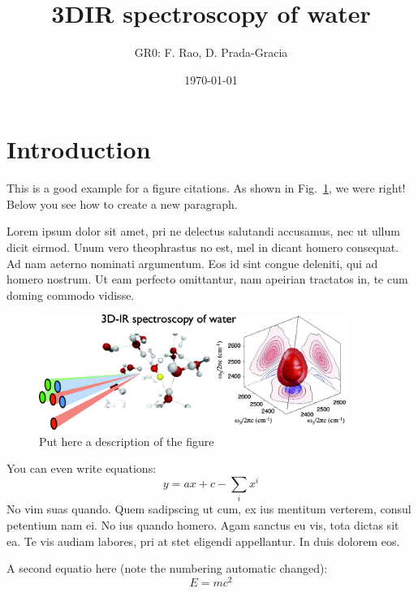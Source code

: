 \documentclass[a4paper,11pt]{article}
\begin{document}
\title{\sf 3DIR spectroscopy of water}
\author{GR0: F. Rao, D. Prada-Gracia}
\date{\today}
\maketitle

\section{Introduction}

This is a good example for a figure citations.
As shown in Fig.~\ref{mydata}, we were right! 
Below you see how to create a new paragraph.

Lorem ipsum dolor sit amet, pri ne delectus
salutandi accusamus, nec ut ullum dicit eirmod. Unum vero theophrastus no est,
mel in dicant homero consequat. Ad nam aeterno nominati argumentum. Eos id sint
congue deleniti, qui ad homero nostrum. Ut eam perfecto omittantur, nam
apeirian tractatos in, te cum doming commodo vidisse.

\begin{figure}
\centering
\includegraphics[width=100mm]{myfig}
\caption{Put here a description of the figure}
\label{mydata}
\end{figure}

You can even write equations:
\begin{equation}
y= ax+c - \sum_i x^i
\end{equation}
No vim suas quando. Quem sadipscing ut cum, ex ius mentitum verterem, consul
petentium nam ei. No ius quando homero. Agam sanctus eu vis, tota dictas sit
ea. Te vis audiam labores, pri at stet eligendi appellantur. In duis dolorem
eos.

A second equatio here (note the numbering automatic changed):
\begin{equation}
E=mc^2
\end{equation}
\end{document}

